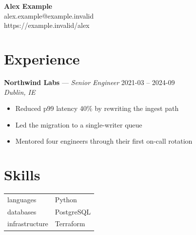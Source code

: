 \documentclass[11pt]{article}
\begin{document}
\begin{center}
  {\LARGE\bfseries Alex Example}\\
  alex.example@example.invalid\\
  https://example.invalid/alex\\
\end{center}
\section*{Experience}
\noindent\textbf{Northwind Labs} --- \textit{Senior Engineer} \hfill 2021-03 -- 2024-09\\
\noindent\textit{Dublin, IE}\par
\begin{itemize}[leftmargin=1.2em,itemsep=1pt]
  \item Reduced p99 latency 40\% by rewriting the ingest path
  \item Led the migration to a single-writer queue
  \item Mentored four engineers through their first on-call rotation
\end{itemize}
\section*{Skills}
\begin{tabularx}{\textwidth}{@{}lX@{}}
  languages & Python \\
  databases & PostgreSQL \\
  infrastructure & Terraform \\
\end{tabularx}
\end{document}
